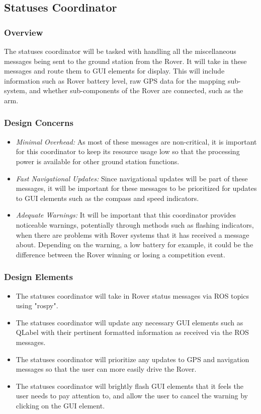 \subsection{Statuses Coordinator}
\subsubsection{Overview}
The statuses coordinator will be tasked with handling all the miscellaneous messages being sent to the ground station from the Rover.
It will take in these messages and route them to GUI elements for display.
This will include information such as Rover battery level, raw GPS data for the mapping sub-system, and whether sub-components of the Rover are connected, such as the arm.

\subsubsection{Design Concerns}
\begin{itemize}
\item \textit{Minimal Overhead:} As most of these messages are non-critical, it is important for this coordinator to keep its resource usage low so that the processing power is available for other ground station functions.
\item \textit{Fast Navigational Updates:} Since navigational updates will be part of these messages, it will be important for these messages to be prioritized for updates to GUI elements such as the compass and speed indicators.
\item \textit{Adequate Warnings:} It will be important that this coordinator provides noticeable warnings, potentially through methods such as flashing indicators, when there are problems with Rover systems that it has received a message about.
Depending on the warning, a low battery for example, it could be the difference between the Rover winning or losing a competition event.
\end{itemize}

\subsubsection{Design Elements}
\begin{itemize}
\item The statuses coordinator will take in Rover status messages via ROS topics using "rospy".
\item The statuses coordinator will update any necessary GUI elements such as QLabel with their pertinent formatted information as received via the ROS messages.
\item The statuses coordinator will prioritize any updates to GPS and navigation messages so that the user can more easily drive the Rover.
\item The statuses coordinator will brightly flash GUI elements that it feels the user needs to pay attention to, and allow the user to cancel the warning by clicking on the GUI element.
\end{itemize}

